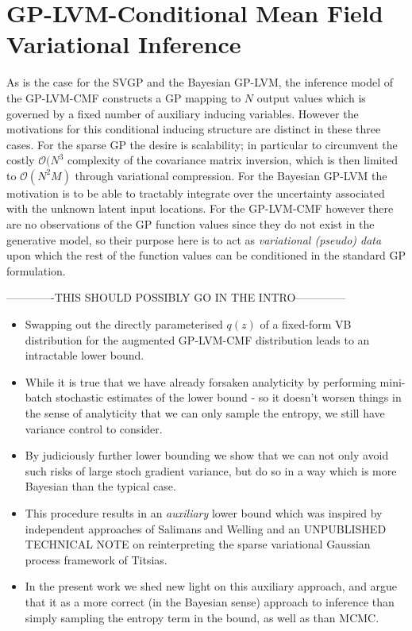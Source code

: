 \documentclass{article}
\begin{document}
\section{GP-LVM-Conditional Mean Field Variational Inference} %
\label{sec:gplvmcmf}

As is the case for the SVGP and the Bayesian GP-LVM, the inference model of the GP-LVM-CMF constructs a GP mapping to $N$ output values which is governed by a fixed number of auxiliary inducing variables. However the motivations for this conditional inducing structure are distinct in these three cases. For the sparse GP the desire is scalability; in particular to circumvent the costly $\mathcal{O}(N^3$ complexity of the covariance matrix inversion, which is then limited to $\mathcal{O}(N^2M)$ through variational compression. For the Bayesian GP-LVM the motivation is to be able to tractably integrate over the uncertainty associated with the unknown latent input locations. For the GP-LVM-CMF however there are no observations of the GP function values since they do not exist in the generative model, so their purpose here is to act as \emph{variational (pseudo) data} upon which the rest of the function values can be conditioned in the standard GP formulation.

-------------THIS SHOULD POSSIBLY GO IN THE INTRO--------------

\begin{itemize}
  \item Swapping out the directly parameterised $q(z)$ of a fixed-form VB distribution for the augmented GP-LVM-CMF distribution leads to an intractable lower bound.
  \item While it is true that we have already forsaken analyticity by performing mini-batch stochastic estimates of the lower bound - so it doesn't worsen things in the sense of analyticity that we can only sample the entropy, we still have variance control to consider.
  \item By judiciously further lower bounding we show that we can not only avoid such risks of large stoch gradient variance, but do so in a way which is more Bayesian than the typical case.
  \item This procedure results in an \emph{auxiliary} lower bound which was inspired by independent approaches of Salimans and Welling and an UNPUBLISHED TECHNICAL NOTE on reinterpreting the sparse variational Gaussian process framework of Titsias.
  \item In the present work we shed new light on this auxiliary approach, and argue that it as a more correct (in the Bayesian sense) approach to inference than simply sampling the entropy term in the bound, as well as than MCMC.
\end{itemize}
\end{document}
